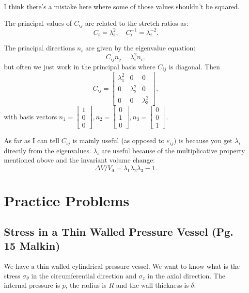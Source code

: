 I think there's a mistake here where some of those values shouldn't be squared. 

The principal values of $C_{ij}$ are related to the stretch ratios as:
\begin{equation}
	C_i = \lambda_i^2, \quad C_i^{-1} = \lambda_i^{-2}.
\end{equation}

The principal directions $n_i$ are given by the eigenvalue equation:
\begin{equation}
	C_{ij} n_j = \lambda_i^2 n_i,
\end{equation}
but often we just work in the principal basis where $C_{ij}$ is diagonal. Then
\begin{equation}
	C_{ij} = \begin{bmatrix}
		\lambda_1^2 & 0 & 0 \\
		0 & \lambda_2^2 & 0 \\
		0 & 0 & \lambda_3^2
	\end{bmatrix}, 
\end{equation}
with basis vectors 
$n_1 = \begin{bmatrix}1 \\ 0 \\ 0\end{bmatrix},
n_2 = \begin{bmatrix}0 \\ 1 \\ 0\end{bmatrix},
n_3 = \begin{bmatrix}0 \\ 0 \\ 1\end{bmatrix}$.

As far as I can tell $C_{ij}$ is mainly useful (as opposed to $\varepsilon_{ij}$) is because you get $\lambda_i$ directly from the eigenvalues.
$\lambda_i$ are useful because of the multiplicative property mentioned above and the invariant volume change:
\begin{equation}
	\Delta V / V_0 = \lambda_1 \lambda_2 \lambda_3 - 1.
\end{equation}


\section{Practice Problems}

\subsection{Stress in a Thin Walled Pressure Vessel (Pg. 15 Malkin)}
We have a thin walled cylindrical pressure vessel.
We want to know what is the stress $\sigma_\theta$ in the circumferential direction and $\sigma_z$ in the axial direction.
The internal pressure is $p$, the radius is $R$ and the wall thickness is $\delta$.

